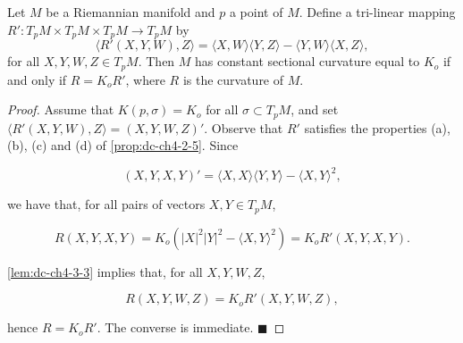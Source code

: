 \begin{lemma}
  \label{lem:dc-ch4-3-4}


  Let $M$ be a Riemannian manifold and $p$ a point of $M$. Define a tri-linear
  mapping $R':T_pM\times T_pM\times T_pM\to T_pM$ by
  $$
  \langle R'(X,Y,W),Z\rangle=\langle X,W\rangle\langle Y,Z\rangle-\langle Y,W\rangle\langle X,Z\rangle,
  $$
  for all $X,Y,W,Z\in T_pM$. Then $M$ has constant sectional curvature equal to
  $K_o$ if and only if $R=K_o R'$, where $R$ is the curvature of $M$.
\end{lemma}
\begin{proof}

  \sketch
  Assume that $K(p,\sigma)=K_o$ for all $\sigma\subset T_pM$, and set
  $\langle R'(X,Y,W),Z\rangle=(X,Y,W,Z)'$. Observe that $R'$ satisfies the properties
  (a), (b), (c) and (d) of \cref{prop:dc-ch4-2-5}. Since

  $$
  (X,Y,X,Y)'=\langle X,X\rangle\langle Y,Y\rangle-\langle X,Y\rangle^2,
  $$

  we have that, for all pairs of vectors $X,Y\in T_pM$,

  $$
  R(X,Y,X,Y)=K_o(|X|^2|Y|^2-\langle X,Y\rangle^2)=K_o R'(X,Y,X,Y).
  $$

  \cref{lem:dc-ch4-3-3} implies that, for all $X,Y,W,Z$,

  $$
  R(X,Y,W,Z)=K_o R'(X,Y,W,Z),
  $$

  hence $R=K_o R'$. The converse is immediate. $\blacksquare$
\end{proof}


